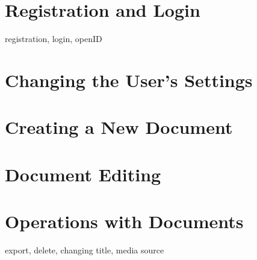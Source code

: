 \label{chap:users_manual}

\section{Registration and Login}
registration, login, openID
\section{Changing the User's Settings}
\section{Creating a New Document}
\section{Document Editing}
\section{Operations with Documents}
export, delete, changing title, media source